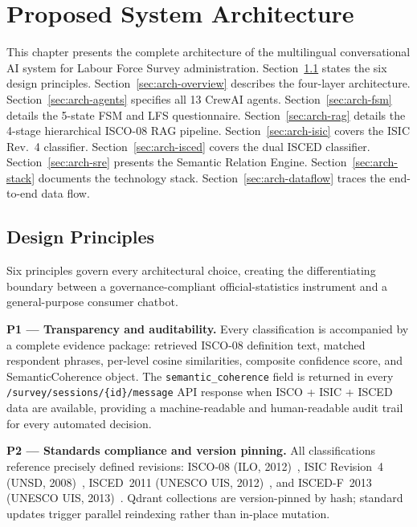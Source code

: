 \chapter{Proposed System Architecture}
\label{chap:architecture}

This chapter presents the complete architecture of the multilingual
conversational AI system for Labour Force Survey administration.
Section~\ref{sec:arch-principles} states the six design principles.
Section~\ref{sec:arch-overview} describes the four-layer architecture.
Section~\ref{sec:arch-agents} specifies all 13 CrewAI agents.
Section~\ref{sec:arch-fsm} details the 5-state FSM and LFS questionnaire.
Section~\ref{sec:arch-rag} details the 4-stage hierarchical ISCO-08 RAG pipeline.
Section~\ref{sec:arch-isic} covers the ISIC Rev.~4 classifier.
Section~\ref{sec:arch-isced} covers the dual ISCED classifier.
Section~\ref{sec:arch-sre} presents the Semantic Relation Engine.
Section~\ref{sec:arch-stack} documents the technology stack.
Section~\ref{sec:arch-dataflow} traces the end-to-end data flow.

\section{Design Principles}
\label{sec:arch-principles}

Six principles govern every architectural choice, creating the differentiating
boundary between a governance-compliant official-statistics instrument and a
general-purpose consumer chatbot.

\textbf{P1 --- Transparency and auditability.}
Every classification is accompanied by a complete evidence package: retrieved
ISCO-08 definition text, matched respondent phrases, per-level cosine
similarities, composite confidence score, and SemanticCoherence object.
The \texttt{semantic\_coherence} field is returned in every
\texttt{/survey/sessions/\{id\}/message} API response when ISCO + ISIC + ISCED
data are available, providing a machine-readable and human-readable audit trail
for every automated decision.

\textbf{P2 --- Standards compliance and version pinning.}
All classifications reference precisely defined revisions: ISCO-08
(ILO, 2012)~\cite{ilo2012isco_v1}, ISIC Revision~4
(UNSD, 2008)~\cite{zhou2025llmdata}, ISCED~2011
(UNESCO UIS, 2012)~\cite{unesco2012isced}, and ISCED-F~2013
(UNESCO UIS, 2013)~\cite{unesco2012isced}.
Qdrant collections are version-pinned by hash; standard updates trigger
parallel reindexing rather than in-place mutation.


